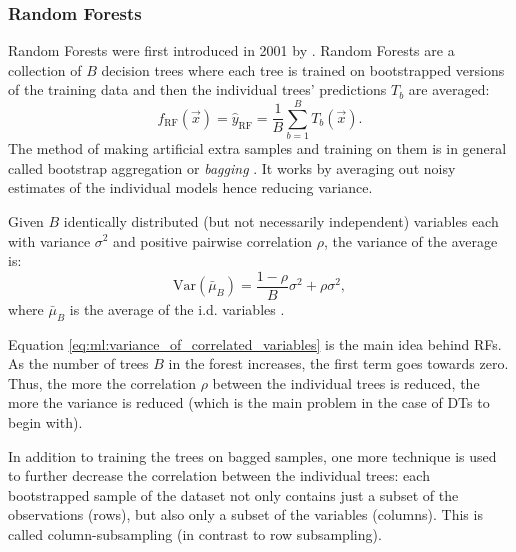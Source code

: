 \subsubsection{Random Forests}
\label{subsubsec:ml:random_forest}
Random Forests were first introduced in 2001 by \citet{breimanRandomForests2001}. Random Forests are a collection of $B$ decision trees where each tree is trained on bootstrapped versions of the training data and then the individual trees' predictions $T_b$ are averaged: 
\begin{equation}
  f_\mathrm{RF}(\vec{x}) = \hat{y}_\mathrm{RF} = \frac{1}{B}  \sum_{b=1}^B T_b(\vec{x}).
\end{equation}
The method of making artificial extra samples and training on them is in general called bootstrap aggregation or \emph{bagging} \autocite{hastieElementsStatisticalLearning2009}. It works by averaging out noisy estimates of the individual models hence reducing variance. 
\begin{theorem}
  Given $B$ identically distributed (but not necessarily independent) variables each with variance $\sigma^2$ and positive pairwise correlation $\rho$, the variance of the average is:
  \begin{equation}
    \label{eq:ml:variance_of_correlated_variables}
    \mathrm{Var}(\bar{\mu}_B) = \frac{1-\rho}{B} \sigma^2 + \rho \sigma^2,
  \end{equation}
  where $\bar{\mu}_B$ is the average of the i.d. variables \autocite{hastieElementsStatisticalLearning2009}. %
\end{theorem}
Equation \eqref{eq:ml:variance_of_correlated_variables} is the main idea behind RFs. As the number of trees $B$ in the forest increases, the first term goes towards zero. Thus, the more the correlation $\rho$ between the individual trees is reduced, the more the variance is reduced (which is the main problem in the case of DTs to begin with). 

In addition to training the trees on bagged samples, one more technique is used to further decrease the correlation between the individual trees: each bootstrapped sample of the dataset not only contains just a subset of the observations (rows), but also only a subset of the variables (columns). This is called column-subsampling (in contrast to row subsampling).

